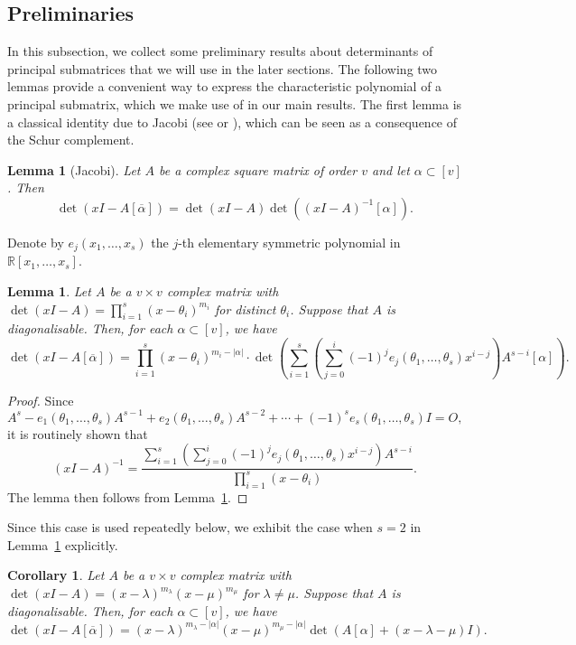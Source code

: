 \documentclass[11pt]{article}
\newtheorem{corollary}[theorem]{Corollary}
\newtheorem{lemma}[theorem]{Lemma}
\begin{document}
\subsection{Preliminaries}

In this subsection, we collect some preliminary results about determinants of principal submatrices that we will use in the later sections.
The following two lemmas provide a convenient way to express the characteristic polynomial of a principal submatrix, which we make use of in our main results.
The first lemma is a classical identity due to Jacobi (see \cite[Page 21]{Jacobi1} or \cite[Page 52]{Jacobi2}), which can be seen as a consequence of the Schur complement.
\begin{lemma}[Jacobi]
\label{lem:decaenjacobi}
    Let $A$ be a complex square matrix of order $v$ and let $\alpha \subset [v]$.
    Then
    \[
    \det(xI - A[\overline{\alpha}]) = \det(xI-A) \det( (xI-A)^{-1}[\alpha] ).
    \]
\end{lemma}

Denote by $e_j(x_1,\dots,x_s)$ the $j$-th elementary symmetric polynomial in $\mathbb R[x_1,\dots,x_s]$.

\begin{lemma}
\label{lem:Jacobi2}
Let $A$ be a $v \times v$ complex matrix with $\det(xI-A) = \prod_{i=1}^s(x-\theta_i)^{m_i}$ for distinct $\theta_i$.
Suppose that $A$ is diagonalisable.
Then, for each $\alpha \subset [v]$, we have
\[
\det(xI-A[\overline{\alpha}]) =\prod_{i=1}^s(x-\theta_i)^{m_i-|\alpha|} \cdot\det \left (\sum_{i=1}^s \left(\sum_{j=0}^i (-1 )^j e_j(\theta_1,\ldots,\theta_s)x^{i-j}\right)A^{s-i}[\alpha] 
 \right ).
\]
\end{lemma}
\begin{proof}
Since 
\[
A^s-e_1(\theta_1,\ldots,\theta_s)A^{s-1}+e_2(\theta_1,\ldots,\theta_s)A^{s-2}+\cdots+(-1)^s e_s(\theta_1,\ldots,\theta_s)I= O,
\]
it is routinely shown that
\[
(xI-A)^{-1} = \frac{\sum_{i=1}^s (\sum_{j=0}^i (-1 )^j e_j(\theta_1,\ldots,\theta_s)x^{i-j})A^{s-i}}{\prod_{i=1}^s (x-\theta_i)}.
\]
The lemma then follows from Lemma~\ref{lem:decaenjacobi}.
\end{proof}

Since this case is used repeatedly below, we exhibit the case when $s=2$ in Lemma~\ref{lem:Jacobi2} explicitly.
\begin{corollary}
\label{cor:Jacobi22}
Let $A$ be a $v \times v$ complex matrix with $\det(xI-A) = (x-\lambda)^{m_\lambda}(x-\mu)^{m_\mu}$ for $\lambda \neq \mu$.
Suppose that $A$ is diagonalisable.
Then, for each $\alpha \subset [v]$, we have
\[
\det(xI-A[\overline{\alpha}]) = (x-\lambda)^{m_\lambda-|\alpha|}(x-\mu)^{m_\mu-|\alpha|}\det \left ( A[\alpha]+(x-\lambda-\mu)I \right ).
\]
\end{corollary}
\end{document}
